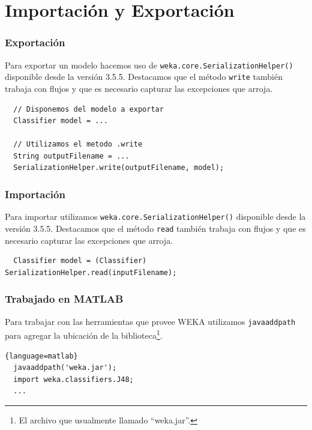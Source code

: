 \documentclass[10pt,a4paper]{article}
\begin{document}

\part{Importación y Exportación}
\section{Exportación}
Para exportar un modelo hacemos uso de \lstinline{weka.core.SerializationHelper()} disponible desde la versión 3.5.5. Destacamos que el método \lstinline{write} también trabaja con flujos y que es necesario capturar las excepciones que arroja.
\begin{lstlisting}
  // Disponemos del modelo a exportar
  Classifier model = ...
  
  // Utilizamos el metodo .write
  String outputFilename = ...
  SerializationHelper.write(outputFilename, model);
\end{lstlisting}

\section{Importación}
Para importar utilizamos \lstinline{weka.core.SerializationHelper()} disponible desde la versión 3.5.5. Destacamos que el método \lstinline{read} también trabaja con flujos y que es necesario capturar las excepciones que arroja.
\begin{lstlisting}
  Classifier model = (Classifier) SerializationHelper.read(inputFilename);
\end{lstlisting}

\section{Trabajado en MATLAB}
Para trabajar con las herramientas que provee WEKA utilizamos \lstinline{javaaddpath} para agregar la ubicación de la biblioteca\footnote{El archivo que usualmente llamado ``weka.jar''.}.

\begin{lstlisting}{language=matlab}
  javaaddpath('weka.jar');
  import weka.classifiers.J48;
  ...
\end{lstlisting}

\printbibliography
\end{document}
